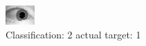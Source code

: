 \begin{figure}[h!]
\begin{center}
\includegraphics[width=0.60\columnwidth]{figures/ID1549_class_2_target_1.png}
\end{center}
\caption{ Classification: 2 actual target: 1}
\label{fig:ID1549_class_2_target_1}
\end{figure}
